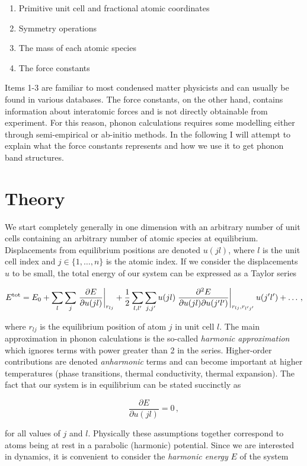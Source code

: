 \begin{enumerate}
	\item Primitive unit cell and fractional atomic coordinates
	\item Symmetry operations
	\item The mass of each atomic species
	\item The force constants
\end{enumerate}

Items 1-3 are familiar to most condensed matter physicists and can usually be found in various databases. The force constants, on the other hand, contains information about interatomic forces and is not directly obtainable from experiment. For this reason, phonon calculations requires some modelling either through semi-empirical or ab-initio methods. In the following I will attempt to explain what the force constants represents and how we use it to get phonon band structures.

\section{Theory}

We start completely generally in one dimension with an arbitrary number of unit cells containing an arbitrary number of atomic species at equilibrium. Displacements from equilibrium positions are denoted $u(jl)$, where $l$ is the unit cell index and $j \in \{1,\dots,n\}$ is the atomic index. If we consider the displacements $u$ to be small, the total energy of our system can be expressed as a Taylor series

\[ E^\text{tot} = E_0 + \sum_{l}\sum_{j} \left. \frac{\partial E}{\partial u(jl)} \right\rvert_{r_{lj}}  + \frac{1}{2} \sum_{l,l^\prime} \sum_{j,j^\prime} u(jl) \left. \frac{\partial ^2 E}{\partial u(jl) \partial u(j^\prime l^\prime)} \right\rvert_{r_{lj}, r_{l^\prime j^\prime}} u(j^\prime l^\prime) + \dots \, , \]

\noindent where $r_{lj}$ is the equilibrium position of atom $j$ in unit cell $l$. The main approximation in phonon calculations is the so-called \emph{harmonic approximation} which ignores terms with power greater than 2 in the series. Higher-order contributions are denoted \emph{anharmonic} terms and can become important at higher temperatures (phase transitions, thermal conductivity, thermal expansion). The fact that our system is in equilibrium can be stated succinctly as

\[ \frac{\partial E}{\partial u(jl)} = 0 \, , \]

\noindent for all values of $j$ and $l$. Physically these assumptions together correspond to atoms being at rest in a parabolic (harmonic) potential. Since we are interested in  dynamics, it is convenient to consider the \emph{harmonic energy} $E$ of the system

